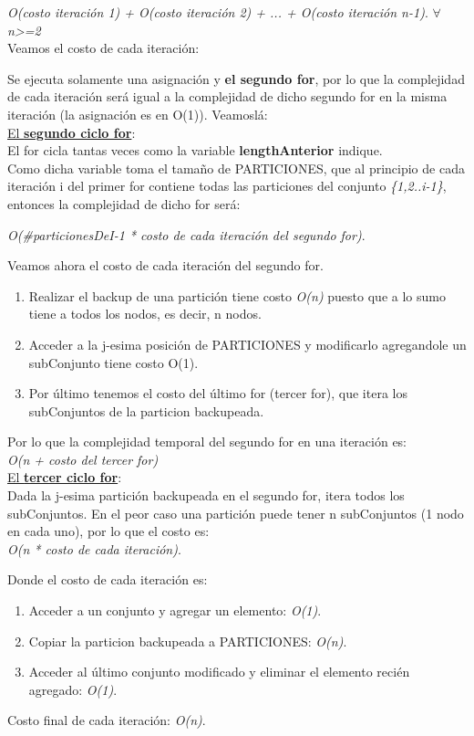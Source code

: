 \documentclass[10pt,a4paper]{article}
\begin{document}
\textit{O(costo iteración 1) + O(costo iteración 2) + ... + O(costo iteración n-1)}. $\forall$\textit{n\textgreater =2}\\

\noindent Veamos el costo de cada iteración:

Se ejecuta solamente una asignación y \textbf{el segundo for}, por lo que la complejidad de cada iteración será igual a la complejidad de dicho segundo for en la misma iteración (la asignación es en O(1)). Veamoslá:\\

\noindent \underline{El \textbf{segundo ciclo for}}:\\
El for cicla tantas veces como la variable \textbf{lengthAnterior} indique.\\
Como dicha variable toma el tamaño de PARTICIONES, que al principio de cada iteración i del primer for contiene todas las particiones del conjunto \textit{\{1,2..i-1\}}, entonces la complejidad de dicho for será:

\textit{ O(\#particionesDeI-1 * costo de cada iteración del segundo for)}.

\noindent Veamos ahora el costo de cada iteración del segundo for.

\begin{enumerate}
\item Realizar el backup de una partición tiene costo \textit{O(n)} puesto que a lo sumo tiene a todos los nodos, es decir, n nodos.
\item Acceder a la j-esima posición de PARTICIONES y modificarlo agregandole un subConjunto tiene costo O(1).
\item Por último tenemos el costo del último for (tercer for), que itera los subConjuntos de la particion backupeada.
\end{enumerate}
Por lo que la complejidad temporal del segundo for en una iteración es:\\
\textit{O(n + costo del tercer for)}\\

\noindent \underline{El \textbf{tercer ciclo for}}:\\
Dada la j-esima partición backupeada en el segundo for, itera todos los subConjuntos. En el peor caso una partición puede tener n subConjuntos (1 nodo en cada uno), por lo que el costo es:\\
\textit{O(n * costo de cada iteración)}.

\noindent Donde el costo de cada iteración es:
\begin{enumerate}
\item Acceder a un conjunto y agregar un elemento: \textit{O(1)}.
\item Copiar la particion backupeada a PARTICIONES: \textit{O(n)}.
\item Acceder al último conjunto modificado y eliminar el elemento recién agregado: \textit{O(1)}.
\end{enumerate}
Costo final de cada iteración: \textit{O(n)}.\\
\end{document}
